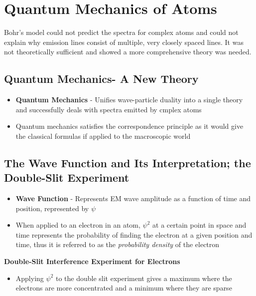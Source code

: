 \section{Quantum Mechanics of Atoms}
Bohr's model could not predict the spectra for complex atoms and could not explain why emission lines consist of multiple, very closely spaced lines. It was not theoretically sufficient and showed a more comprehensive theory was needed.

\subsection{Quantum Mechanics- A New Theory}
\begin{itemize}
    \item \textbf{Quantum Mechanics} - Unifies wave-particle duality into a single theory and successfully deals with spectra emitted by cmplex atoms
    \item Quantum mechanics satisfies the correspondence principle as it would give the classical formulas if applied to the macroscopic world
\end{itemize}

\subsection{The Wave Function and Its Interpretation; the Double-Slit Experiment}
\begin{itemize}
    \item \textbf{Wave Function} - Represents EM wave amplitude as a function of time and position, represented by \(\psi\)
    \item When applied to an electron in an atom, \(\psi^2\) at a certain point in space and time represents the probability of finding the electron at a given position and time, thus it is referred to as the \emph{probability density} of the electron
\end{itemize}

\textbf{Double-Slit Interference Experiment for Electrons}
\begin{itemize}
    \item Applying \(\psi^2\) to the double slit experiment gives a maximum where the electrons are more concentrated and a minimum where they are sparse
\end{itemize}


